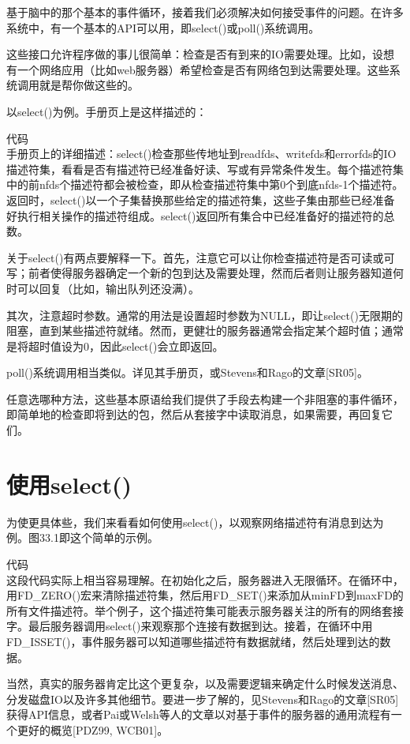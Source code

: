 基于脑中的那个基本的事件循环，接着我们必须解决如何接受事件的问题。在许多系统中，有一个基本的API可以用，即select()或poll()系统调用。

这些接口允许程序做的事儿很简单：检查是否有到来的IO需要处理。比如，设想有一个网络应用（比如web服务器）希望检查是否有网络包到达需要处理。这些系统调用就是帮你做这些的。

以select()为例。手册页上是这样描述的：

代码\\

手册页上的详细描述：select()检查那些传地址到readfds、writefds和errorfds的IO描述符集，看看是否有描述符已经准备好读、写或有异常条件发生。每个描述符集中的前nfds个描述符都会被检查，即从检查描述符集中第0个到底nfds-1个描述符。返回时，select()以一个子集替换那些给定的描述符集，这些子集由那些已经准备好执行相关操作的描述符组成。select()返回所有集合中已经准备好的描述符的总数。

关于select()有两点要解释一下。首先，注意它可以让你检查描述符是否可读或可写；前者使得服务器确定一个新的包到达及需要处理，然而后者则让服务器知道何时可以回复（比如，输出队列还没满）。

其次，注意超时参数。通常的用法是设置超时参数为NULL，即让select()无限期的阻塞，直到某些描述符就绪。然而，更健壮的服务器通常会指定某个超时值；通常是将超时值设为0，因此select()会立即返回。

poll()系统调用相当类似。详见其手册页，或Stevens和Rago的文章[SR05]。

任意选哪种方法，这些基本原语给我们提供了手段去构建一个非阻塞的事件循环，即简单地的检查即将到达的包，然后从套接字中读取消息，如果需要，再回复它们。


\section{使用select()}

为使更具体些，我们来看看如何使用select()，以观察网络描述符有消息到达为例。图33.1即这个简单的示例。

代码\\

这段代码实际上相当容易理解。在初始化之后，服务器进入无限循环。在循环中，用FD\_ZERO()宏来清除描述符集，然后用FD\_SET()来添加从minFD到maxFD的所有文件描述符。举个例子，这个描述符集可能表示服务器关注的所有的网络套接字。最后服务器调用select()来观察那个连接有数据到达。接着，在循环中用FD\_ISSET()，事件服务器可以知道哪些描述符有数据就绪，然后处理到达的数据。

当然，真实的服务器肯定比这个更复杂，以及需要逻辑来确定什么时候发送消息、分发磁盘IO以及许多其他细节。要进一步了解的，见Stevens和Rago的文章[SR05]获得API信息，或者Pai或Welsh等人的文章以对基于事件的服务器的通用流程有一个更好的概览[PDZ99, WCB01]。


